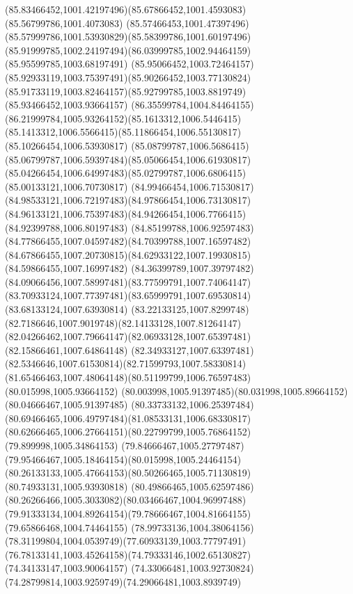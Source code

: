 {{  \curveto(85.83466452,1001.42197496)(85.67866452,1001.4593083)(85.56799786,1001.4073083)
  \curveto(85.57466453,1001.47397496)(85.57999786,1001.53930829)(85.58399786,1001.60197496)
  \curveto(85.91999785,1002.24197494)(86.03999785,1002.94464159)(85.95599785,1003.68197491)
  \curveto(85.95066452,1003.72464157)(85.92933119,1003.75397491)(85.90266452,1003.77130824)
  \curveto(85.91733119,1003.82464157)(85.92799785,1003.8819749)(85.93466452,1003.93664157)
  \curveto(86.35599784,1004.84464155)(86.21999784,1005.93264152)(85.1613312,1006.5446415)
  \curveto(85.1413312,1006.5566415)(85.11866454,1006.55130817)(85.10266454,1006.53930817)
  \curveto(85.08799787,1006.5686415)(85.06799787,1006.59397484)(85.05066454,1006.61930817)
  \curveto(85.04266454,1006.64997483)(85.02799787,1006.6806415)(85.00133121,1006.70730817)
  \curveto(84.99466454,1006.71530817)(84.98533121,1006.72197483)(84.97866454,1006.73130817)
  \curveto(84.96133121,1006.75397483)(84.94266454,1006.7766415)(84.92399788,1006.80197483)
  \curveto(84.85199788,1006.92597483)(84.77866455,1007.04597482)(84.70399788,1007.16597482)
  \curveto(84.67866455,1007.20730815)(84.62933122,1007.19930815)(84.59866455,1007.16997482)
  \curveto(84.36399789,1007.39797482)(84.09066456,1007.58997481)(83.77599791,1007.74064147)
  \curveto(83.70933124,1007.77397481)(83.65999791,1007.69530814)(83.68133124,1007.63930814)
  \curveto(83.22133125,1007.8299748)(82.7186646,1007.9019748)(82.14133128,1007.81264147)
  \curveto(82.04266462,1007.79664147)(82.06933128,1007.65397481)(82.15866461,1007.64864148)
  \curveto(82.34933127,1007.63397481)(82.5346646,1007.61530814)(82.71599793,1007.58330814)
  \curveto(81.65466463,1007.48064148)(80.51199799,1006.76597483)(80.015998,1005.93664152)
  \curveto(80.003998,1005.91397485)(80.031998,1005.89664152)(80.04666467,1005.91397485)
  \curveto(80.33733132,1006.25397484)(80.69466465,1006.49797484)(81.08533131,1006.68330817)
  \curveto(80.62666465,1006.27664151)(80.22799799,1005.76864152)(79.899998,1005.34864153)
  \curveto(79.84666467,1005.27797487)(79.95466467,1005.18464154)(80.015998,1005.24464154)
  \curveto(80.26133133,1005.47664153)(80.50266465,1005.71130819)(80.74933131,1005.93930818)
  \curveto(80.49866465,1005.62597486)(80.26266466,1005.3033082)(80.03466467,1004.96997488)
  \curveto(79.91333134,1004.89264154)(79.78666467,1004.81664155)(79.65866468,1004.74464155)
  \curveto(78.99733136,1004.38064156)(78.31199804,1004.0539749)(77.60933139,1003.77797491)
  \curveto(76.78133141,1003.45264158)(74.79333146,1002.65130827)(74.34133147,1003.90064157)
  \curveto(74.33066481,1003.92730824)(74.28799814,1003.9259749)(74.29066481,1003.8939749)
}}
